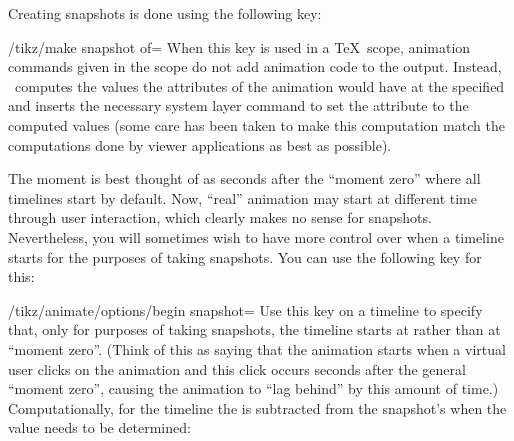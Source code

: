 Creating snapshots is done using the following key:

\begin{key}{/tikz/make snapshot of=}
    When this key is used in a \TeX\ scope, animation commands given in the
    scope do not add animation code to the output. Instead, \tikzname\ computes
    the values the attributes of the animation would have at the specified
     and inserts the necessary system layer command to set the
    attribute to the computed values (some care has been taken to make this
    computation match the computations done by viewer applications as best as
    possible).
\begin{codeexample}[preamble={\usetikzlibrary{animations}}]
\end{codeexample}

    The moment  is best thought of as  seconds after the
    ``moment zero'' where all timelines start by default. Now, ``real''
    animation may start at different time through user interaction, which
    clearly makes no sense for snapshots. Nevertheless, you will sometimes wish
    to have more control over when a timeline starts for the purposes of taking
    snapshots. You can use the following key for this:

    \begin{key}{/tikz/animate/options/begin snapshot=}
        Use this key on a timeline to specify that, only for purposes of taking
        snapshots, the timeline starts at  rather than at
        ``moment zero''. (Think of this as saying that the animation starts
        when a virtual user clicks on the animation and this click occurs
         seconds after the general ``moment zero'', causing
        the animation to ``lag behind'' by this amount of time.)
        Computationally, for the timeline the  is subtracted
        from the snapshot's  when the value needs to be determined:
\begin{codeexample}[preamble={\usetikzlibrary{animations}}]
\end{codeexample}
    \end{key}


\end{key}
